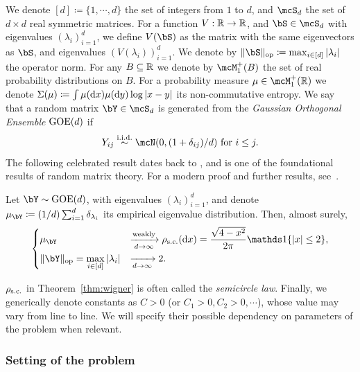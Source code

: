 We denote $[d] \coloneqq \{1, \cdots, d\}$ the set of integers from $1$ to $d$,
and $\mcS_d$ the set of $d \times d$ real symmetric matrices.
For a function $V : \mathbb{R} \to \mathbb{R}$, and $\bS \in \mcS_d$ with eigenvalues $(\lambda_i)_{i=1}^d$, we define $V(\bS)$ as the matrix with the same eigenvectors as $\bS$,
and eigenvalues $(V(\lambda_i))_{i=1}^d$. 
We denote by $\|\bS\|_{\op} \coloneqq \max_{i \in [d]}|\lambda_i|$ the operator norm.
For any $B \subseteq \mathbb{R}$ we denote by $\mcM_1^+(B)$ the set of real probability distributions on $B$.
For a probability measure $\mu \in \mcM_1^+(\bbR)$ we denote $\Sigma(\mu) \coloneqq \int \mu(\mathrm{d} x) \mu(\mathrm{d} y) \log |x - y|$ its non-commutative entropy. 
We say that a random matrix $\bY \in \mcS_d$ is generated from the \emph{Gaussian Orthogonal Ensemble} $\mathrm{GOE}(d)$ if
\begin{equation*}
    Y_{ij} \iid \mcN(0, (1+\delta_{ij})/d) \textrm{ for } i \leq j.
\end{equation*}
The following celebrated result dates back to \cite{wigner1955characteristic}, and is one of the foundational results of random matrix theory. 
For a modern proof and further results, see~\cite{anderson2010introduction}.
\begin{theorem}\label{thm:wigner}
    Let $\bY \sim \GOE(d)$, with eigenvalues $(\lambda_i)_{i=1}^d$, and denote $\mu_\bY \coloneqq (1/d) \sum_{i=1}^d \delta_{\lambda_i}$ its empirical eigenvalue distribution.
    Then, almost surely,
    \begin{equation*}
        \begin{dcases}
            \mu_\bY &\xrightarrow[d \to \infty]{\textrm{weakly}} \rho_{\sci}(\rd x) = \frac{\sqrt{4-x^2}}{2\pi} \indi\{|x| \leq 2\}, \\
            \|\bY\|_\op = \max_{i \in [d]} |\lambda_i| &\xrightarrow[d \to \infty]{} 2.
        \end{dcases}
    \end{equation*}
\end{theorem}
\noindent
$\rho_{\mathrm{s.c.}}$ in Theorem~\ref{thm:wigner} is often called the \emph{semicircle law}.
Finally, we generically denote constants as $C > 0$ (or $C_1 > 0, C_2 > 0, \cdots$), whose value may vary from line to line.
We will specify their possible dependency on parameters of the problem when relevant.

\subsubsection{Setting of the problem} 

